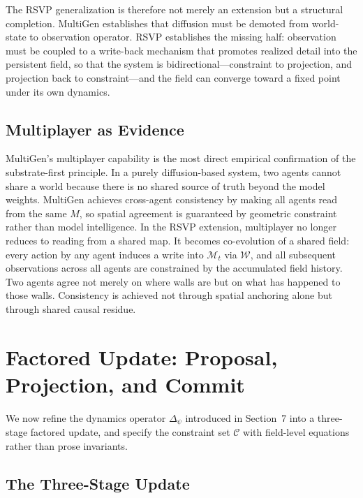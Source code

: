 \documentclass[11pt]{article}
\begin{document}
The RSVP generalization is therefore not merely an extension but a
structural completion.
MultiGen establishes that diffusion must be demoted from world-state to
observation operator.
RSVP establishes the missing half: observation must be coupled to a
write-back mechanism that promotes realized detail into the persistent
field, so that the system is bidirectional---constraint to projection,
and projection back to constraint---and the field can converge toward
a fixed point under its own dynamics.

\subsection{Multiplayer as Evidence}

MultiGen's multiplayer capability is the most direct empirical confirmation
of the substrate-first principle.
In a purely diffusion-based system, two agents cannot share a world because
there is no shared source of truth beyond the model weights.
MultiGen achieves cross-agent consistency by making all agents read from
the same $M$, so spatial agreement is guaranteed by geometric constraint
rather than model intelligence.
In the RSVP extension, multiplayer no longer reduces to reading from a
shared map.
It becomes co-evolution of a shared field: every action by any agent
induces a write into $\mathcal{M}_t$ via $\mathcal{W}$, and all subsequent
observations across all agents are constrained by the accumulated field
history.
Two agents agree not merely on where walls are but on what has happened to
those walls.
Consistency is achieved not through spatial anchoring alone but through
shared causal residue.

\section{Factored Update: Proposal, Projection, and Commit}
\label{sec:factored}

We now refine the dynamics operator $\Delta_\psi$ introduced in
Section~7 into a three-stage factored update, and specify the constraint
set $\mathcal{C}$ with field-level equations rather than prose invariants.

\subsection{The Three-Stage Update}
\end{document}
